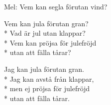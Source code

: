 \begin{SongText}
    \begin{SongVerse}
        Mel: Vem kan segla förutan vind?
    \end{SongVerse}
    \begin{SongVerse}
        Vem kan jula förutan gran?\\*%
        Vad är jul utan klappar?\\*%
        Vem kan pröjsa för julefröjd\\*%
        utan att fälla tårar?
    \end{SongVerse}
    \begin{SongVerse}
        Jag kan jula förutan gran.\\*%
        Jag kan avstå från klappar,\\*%
        men ej pröjsa för julefröjd\\*%
        utan att fälla tårar.
    \end{SongVerse}
\end{SongText}
